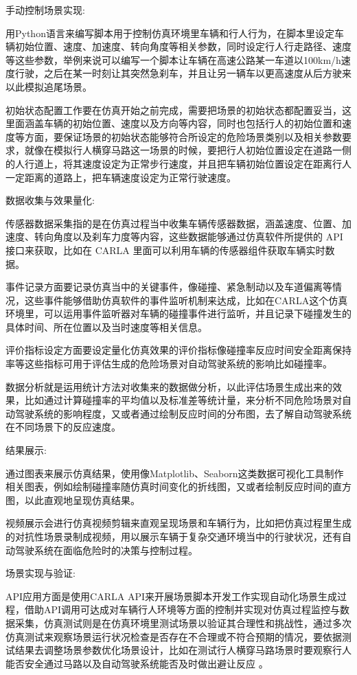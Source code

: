 手动控制场景实现:

用Python语言来编写脚本用于控制仿真环境里车辆和行人行为，在脚本里设定车辆初始位置、速度、加速度、转向角度等相关参数，同时设定行人行走路径、速度等这些参数，举例来说可以编写一个脚本让车辆在高速公路某一车道以100km/h速度行驶，之后在某一时刻让其突然急刹车，并且让另一辆车以更高速度从后方驶来以此模拟追尾场景\cite{benmimoun2011incident}。

初始状态配置工作要在仿真开始之前完成，需要把场景的初始状态都配置妥当，这里面涵盖车辆的初始位置、速度以及方向等内容，同时也包括行人的初始位置和速度等方面，要保证场景的初始状态能够符合所设定的危险场景类别以及相关参数要求，就像在模拟行人横穿马路这一场景的时候，要把行人初始位置设定在道路一侧的人行道上，将其速度设定为正常步行速度，并且把车辆初始位置设定在距离行人一定距离的道路上，把车辆速度设定为正常行驶速度\cite{benmimoun2014detection}。


数据收集与效果量化:

传感器数据采集指的是在仿真过程当中收集车辆传感器数据，涵盖速度、位置、加速度、转向角度以及刹车力度等内容，这些数据能够通过仿真软件所提供的 API 接口来获取，比如在 CARLA 里面可以利用车辆的传感器组件获取车辆实时数据\cite{石娟2017行人自动紧急制动系统测试评价方法研究}。

事件记录方面要记录仿真当中的关键事件，像碰撞、紧急制动以及车道偏离等情况，这些事件能够借助仿真软件的事件监听机制来达成，比如在CARLA这个仿真环境里，可以运用事件监听器对车辆的碰撞事件进行监听，并且记录下碰撞发生的具体时间、所在位置以及当时速度等相关信息。

评价指标设定方面要设定量化仿真效果的评价指标像碰撞率反应时间安全距离保持率等这些指标可用于评估生成的危险场景对自动驾驶系统的影响比如碰撞率。

数据分析就是运用统计方法对收集来的数据做分析，以此评估场景生成出来的效果，比如通过计算碰撞率的平均值以及标准差等统计量，来分析不同危险场景对自动驾驶系统的影响程度，又或者通过绘制反应时间的分布图，去了解自动驾驶系统在不同场景下的反应速度。

结果展示:

通过图表来展示仿真结果，使用像Matplotlib、Seaborn这类数据可视化工具制作相关图表，例如绘制碰撞率随仿真时间变化的折线图，又或者绘制反应时间的直方图，以此直观地呈现仿真结果。

视频展示会进行仿真视频剪辑来直观呈现场景和车辆行为，比如把仿真过程里生成的对抗性场景录制成视频，用以展示车辆于复杂交通环境当中的行驶状况，还有自动驾驶系统在面临危险时的决策与控制过程。

场景实现与验证:

API应用方面是使用CARLA API来开展场景脚本开发工作实现自动化场景生成过程，借助API调用可达成对车辆行人环境等方面的控制并实现对仿真过程监控与数据采集，仿真测试则是在仿真环境里测试场景以验证其合理性和挑战性，通过多次仿真测试来观察场景运行状况检查是否存在不合理或不符合预期的情况，要依据测试结果去调整场景参数优化场景设计，比如在测试行人横穿马路场景时要观察行人能否安全通过马路以及自动驾驶系统能否及时做出避让反应\cite{eigen2009problem} 。

